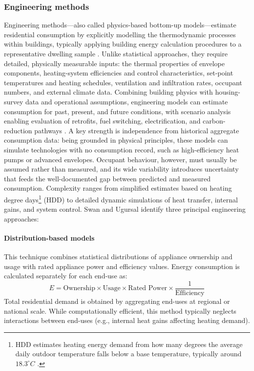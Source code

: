\subsubsection*{Engineering methods}
Engineering methods—also called physics-based bottom-up models—estimate residential consumption by explicitly modelling the thermodynamic processes within buildings, typically applying building energy calculation procedures to a representative dwelling sample \cite{kavgicReviewBottomupBuilding2010}.
Unlike statistical approaches, they require detailed, physically measurable inputs: the thermal properties of envelope components, heating-system efficiencies and control characteristics, set-point temperatures and heating schedules, ventilation and infiltration rates, occupant numbers, and external climate data.
\newline Combining building physics with housing-survey data and operational assumptions, engineering models can estimate consumption for past, present, and future conditions, with scenario analysis enabling evaluation of retrofits, fuel switching, electrification, and carbon-reduction pathways \cite{kavgicReviewBottomupBuilding2010}.
\newline A key strength is independence from historical aggregate consumption data: being grounded in physical principles, these models can simulate technologies with no consumption record, such as high-efficiency heat pumps or advanced envelopes. Occupant behaviour, however, must usually be assumed rather than measured, and its wide variability introduces uncertainty that feeds the well-documented gap between predicted and measured consumption. Complexity ranges from simplified estimates based on heating degree days\footnote{HDD estimates heating energy demand from how many degrees the average daily outdoor temperature falls below a base temperature, typically around $18.3^{\circ}C$ \cite{usdepartmentofcommerceWhatAreHeating}.} (HDD) to detailed dynamic simulations of heat transfer, internal gains, and system control.
\newline Swan and Ugursal \cite{swan_modeling_2009} identify three principal engineering approaches:

\paragraph{Distribution-based models}
This technique combines statistical distributions of appliance ownership and usage with rated appliance power and efficiency values. Energy consumption is calculated separately for each end-use as:
$$ E= \text{Ownership} \times \text{Usage} \times \text{Rated Power} \times \mathrm{\frac{1}{Efficiency}}$$
Total residential demand is obtained by aggregating end-uses at regional or national scale. While computationally efficient, this method typically neglects interactions between end-uses (e.g., internal heat gains affecting heating demand).
